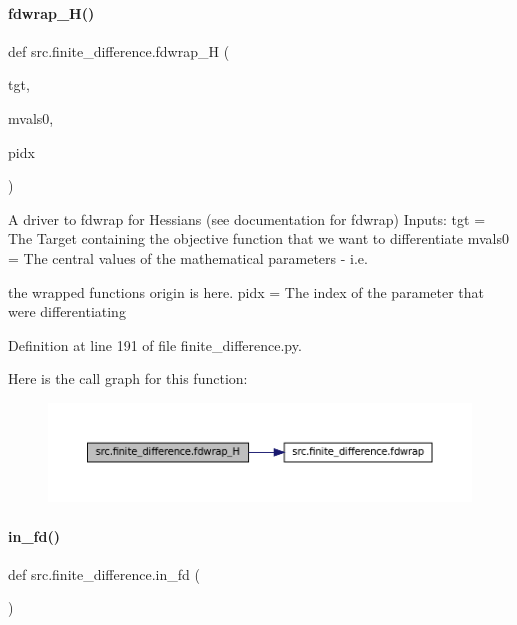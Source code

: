 \paragraph{\texorpdfstring{fdwrap\+\_\+\+H()}{fdwrap\_H()}}
{\footnotesize\ttfamily def src.\+finite\+\_\+difference.\+fdwrap\+\_\+H (\begin{DoxyParamCaption}\item[{}]{tgt,  }\item[{}]{mvals0,  }\item[{}]{pidx }\end{DoxyParamCaption})}



A driver to fdwrap for Hessians (see documentation for fdwrap) Inputs\+: tgt = The Target containing the objective function that we want to differentiate mvals0 = The \textquotesingle{}central\textquotesingle{} values of the mathematical parameters -\/ i.\+e. 

the wrapped function\textquotesingle{}s origin is here. pidx = The index of the parameter that we\textquotesingle{}re differentiating 

Definition at line 191 of file finite\+\_\+difference.\+py.

Here is the call graph for this function\+:
\nopagebreak
\begin{figure}[H]
\begin{center}
\leavevmode
\includegraphics[width=350pt]{namespacesrc_1_1finite__difference_a29e89e33f7fd5acd4569125c0c5f4732_cgraph}
\end{center}
\end{figure}
\mbox{\label{namespacesrc_1_1finite__difference_a6153660ad18674fc1d2ad6fd57541ef3}} 
\paragraph{\texorpdfstring{in\+\_\+fd()}{in\_fd()}}
{\footnotesize\ttfamily def src.\+finite\+\_\+difference.\+in\+\_\+fd (\begin{DoxyParamCaption}{ }\end{DoxyParamCaption})}



